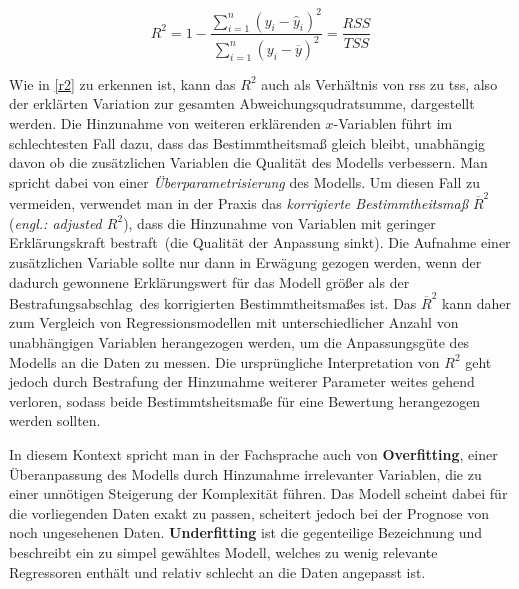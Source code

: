 \begin{equation}
R^2 = 1 - \frac{\sum\limits_{i=1}^n (y_i - \hat{y}_i)^2}{\sum\limits_{i=1}^n (y_i - \overline{y})^2}= \frac{RSS}{TSS}
\label{r2}
\end{equation}

Wie in \vref{r2} zu erkennen ist, kann das $R^2$ auch als Verhältnis von \gls{rss} zu \gls{tss}, also der erklärten Variation zur gesamten Abweichungsqudratsumme, dargestellt werden. Die Hinzunahme von weiteren erklärenden $x$-Variablen führt im schlechtesten Fall dazu, dass das Bestimmtheitsmaß gleich bleibt, unabhängig davon ob die zusätzlichen Variablen die Qualität des Modells verbessern. Man spricht dabei von einer \textit{Überparametrisierung} des Modells. Um diesen Fall zu vermeiden, verwendet man in der Praxis das \textit{korrigierte Bestimmtheitsmaß} $\overline{R}^2$ (\textit{engl.: adjusted $R^2$}), dass die Hinzunahme von Variablen mit geringer Erklärungskraft \glqq bestraft\grqq~(die Qualität der Anpassung sinkt). Die Aufnahme einer zusätzlichen Variable sollte nur dann in Erwägung gezogen werden, wenn der dadurch gewonnene Erklärungswert für das Modell größer als der \glqq Bestrafungsabschlag\grqq~des korrigierten Bestimmtheitsmaßes ist. Das $\overline{R}^2$ kann daher zum Vergleich von Regressionsmodellen mit unterschiedlicher Anzahl von unabhängigen Variablen herangezogen werden, um die Anpassungsgüte des Modells an die Daten zu messen. Die ursprüngliche Interpretation von $R^2$ geht jedoch durch Bestrafung der Hinzunahme weiterer Parameter weites gehend verloren, sodass beide Bestimmtsheitsmaße für eine Bewertung herangezogen werden sollten. 

In diesem Kontext spricht man in der Fachsprache auch von \textbf{Overfitting}, einer Überanpassung des Modells durch Hinzunahme irrelevanter Variablen, die zu einer unnötigen Steigerung der Komplexität führen. Das Modell scheint dabei für die vorliegenden Daten exakt zu passen, scheitert jedoch bei der Prognose von noch ungesehenen Daten. \textbf{Underfitting} ist die gegenteilige Bezeichnung und beschreibt ein zu simpel gewähltes Modell, welches zu wenig relevante Regressoren enthält und relativ schlecht an die Daten angepasst ist. 


